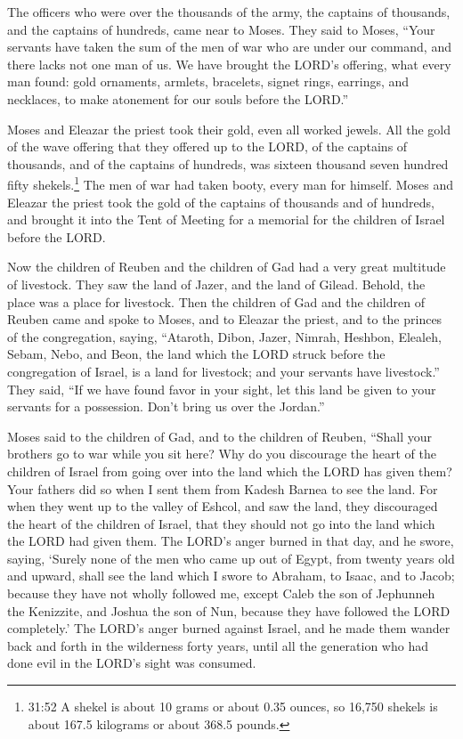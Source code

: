 \myverse{}The officers who were over the thousands of the army, the captains
of thousands, and the captains of hundreds, came near to Moses.
\myverse{}They said to Moses, “Your servants have taken the sum of the men of war who
are under our command, and there lacks not one man of us.
\myverse{}We have brought the LORD’s offering, what every man found: gold ornaments,
armlets, bracelets, signet rings, earrings, and necklaces, to make atonement for our souls before the
LORD.”


\myverse{}Moses and Eleazar the priest took their gold, even all worked
jewels.
\myverse{}All the gold of the wave offering that they offered up to the LORD, of the
captains of thousands, and of the captains of hundreds, was sixteen thousand seven hundred fifty shekels.\footnote{ 31:52 A shekel is about 10 grams or about 0.35 ounces, so 16,750 shekels is about 167.5 kilograms or
	about 368.5 pounds.}
\myverse{}The men of war had taken booty, every man for himself.
\myverse{}Moses and Eleazar the priest took the gold of the captains of thousands and
of hundreds, and brought it into the Tent of Meeting for a memorial for the children of Israel before
the LORD.


\mychapter{} \myverse*{}Now the children of Reuben and the children of Gad had a very
great multitude of livestock. They saw the land of Jazer, and the land of Gilead. Behold, the place was
a place for livestock.
\myverse{}Then the children of Gad and the children of Reuben came and spoke to Moses,
and to Eleazar the priest, and to the princes of the congregation, saying,
\myverse{}“Ataroth, Dibon, Jazer, Nimrah, Heshbon, Elealeh, Sebam, Nebo, and Beon,
\myverse{}the land which the LORD struck before the congregation of Israel, is a land
for livestock; and your servants have livestock.”
\myverse{}They said, “If we have found favor in your sight, let this land be given to
your servants for a possession. Don’t bring us over the Jordan.”


\myverse{}Moses said to the children of Gad, and to the children of Reuben,
“Shall your brothers go to war while you sit here?
\myverse{}Why do you discourage the heart of the children of Israel from going over into
the land which the LORD has given them?
\myverse{}Your fathers did so when I sent them from Kadesh Barnea to see the land.
\myverse{}For when they went up to the valley of Eshcol, and saw the land, they discouraged
the heart of the children of Israel, that they should not go into the land which the LORD had given them.
\myverse{}The LORD’s anger burned in that day, and he swore, saying,
\myverse{}‘Surely none of the men who came up out of Egypt, from twenty years old and
upward, shall see the land which I swore to Abraham, to Isaac, and to Jacob; because they have not wholly
followed me,
\myverse{}except Caleb the son of Jephunneh the Kenizzite, and Joshua the son of Nun,
because they have followed the LORD completely.’
\myverse{}The LORD’s anger burned against Israel, and he made them wander back and
forth in the wilderness forty years, until all the generation who had done evil in the LORD’s sight was
consumed.


